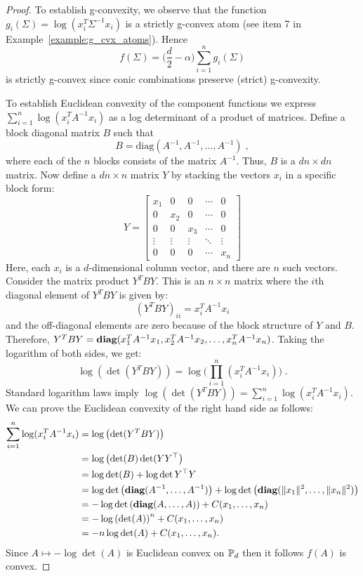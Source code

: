 \documentclass[sn-nature]{sn-jnl}%
\theoremstyle{thmstyleone}%
\theoremstyle{thmstyletwo}%
\theoremstyle{thmstylethree}%
\begin{document}
\begin{proof}
    To establish g-convexity, we observe that the function $g_i(\Sigma) = \log (x_i^T \Sigma^{-1} x_i)$ is a strictly g-convex atom (see item 7 in Example~\ref{example:g_cvx_atoms}). Hence 
    \[
    f(\Sigma) =  \Big(\frac{d}{2}-\alpha\Big)  \sum_{i=1}^n g_i(\Sigma) 
    \]
    is strictly g-convex since conic combinations preserve (strict) g-convexity. 

    To establish Euclidean convexity of the component functions we express \(\sum_{i=1}^n \log(x_i^T A^{-1} x_i)\) as a log determinant of a product of matrices. Define a block diagonal matrix \(B\) such that
   \[
   B = \text{diag}(A^{-1}, A^{-1}, \ldots, A^{-1}) \; ,
   \]
   where each of the \(n\) blocks consists of the matrix \(A^{-1}\). Thus, \(B\) is a \(dn \times dn\) matrix. Now define a \(dn \times n\) matrix \(Y\) by stacking the vectors \(x_i\) in a specific block form:
   \[
   Y = \begin{bmatrix}
   x_1 & 0 & 0 & \cdots & 0 \\
   0 & x_2 & 0 & \cdots & 0 \\
   0 & 0 & x_3 & \cdots & 0 \\
   \vdots & \vdots & \vdots & \ddots & \vdots \\
   0 & 0 & 0 & \cdots & x_n
   \end{bmatrix}
   \]
   Here, each \(x_i\) is a \(d\)-dimensional column vector, and there are \(n\) such vectors. Consider the matrix product \(Y^T B Y\). This is an \(n \times n\) matrix where the \(i\)th diagonal element of \(Y^T B Y\) is given by:
   \[
   (Y^T B Y)_{ii} = x_i^T A^{-1} x_i
   \]
   and the off-diagonal elements are zero because of the block structure of \(Y\) and \(B\). Therefore,
  $Y^T B Y = \textbf{diag} (x_1^T A^{-1} x_1, x_2^T A^{-1} x_2, \ldots, x_n^T A^{-1} x_n)$. Taking the logarithm of both sides, we get:
   \[
   \log(\det(Y^T B Y)) = \log\Big(\prod_{i=1}^n (x_i^T A^{-1} x_i)\Big) \; .
   \]
   Standard logarithm laws imply $\log(\det(Y^T B Y)) = \sum_{i=1}^n \log(x_i^T A^{-1} x_i)$.
We can prove the Euclidean convexity of the right hand side as follows:
\[
\begin{aligned}
    \sum_{i=1}^n \log(x_i^T A^{-1} x_i) &= \log\left(\det(Y^T B Y)\right)
    \\&=\log \left(\det(B) \det (YY^\top\right)
    \\&= \log \det (B) + \log \det Y^\top Y
    \\& = \log \det \left(\textbf{diag}(A^{-1}, \ldots, A^{-1})\right) + \log \det \left( \textbf{diag}(\|x_1\|^2, \ldots, \|x_n\|^2)\right)
    \\&= - \log \det \left(\textbf{diag}(A, \ldots, A)\right) + C(x_1, \ldots,x_n)
    \\&= - \log \left(\det(A)\right)^n + C(x_1, \ldots,x_n)
    \\&= - n\log \det(A) + C(x_1, \ldots, x_n). 
\end{aligned}
\]
Since $A \mapsto - \log \det(A)$ is Euclidean convex on $\mathbb{P}_d$ then it follows $f(A)$ is convex.
\end{proof}
\end{document}

